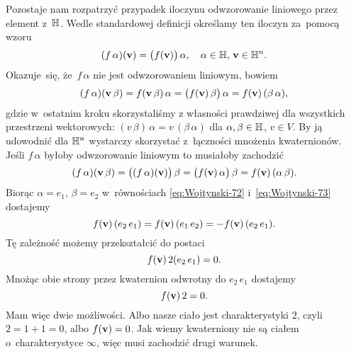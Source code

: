 \documentclass[a4paper,11pt]{article}
\begin{document}
Pozostaje nam rozpatrzyć przypadek iloczynu odwzorowanie liniowego przez
element z~$\mathbb{H}$. Wedle standardowej definicji określamy ten iloczyn
za~pomocą wzoru
\begin{equation}
  \label{eq:Wojtynski-71}
  ( f \, \alpha )( \mathbf{v} ) = \big( f( \mathbf{v} ) \big) \, \alpha, \quad
  \alpha \in \mathbb{H}, \, \mathbf{v} \in \mathbb{H}^{ n }.
\end{equation}
Okazuje~się, że~$f \, \alpha$ nie jest odwzorowaniem liniowym, bowiem
\begin{equation}
  \label{eq:Wojtynski-72}
  ( f \, \alpha )( \mathbf{v} \, \beta ) = f( \mathbf{v} \, \beta ) \, \alpha =
  \big( f( \mathbf{v} ) \, \beta \big) \, \alpha =
  f( \mathbf{v} ) \, ( \beta \, \alpha ),
\end{equation}
gdzie w~ostatnim kroku skorzystaliśmy z własności prawdziwej dla
wszystkich przestrzeni wektorowych:
$( v \, \beta ) \, \alpha = v \, ( \beta \, \alpha )$ dla $\alpha, \beta \in \mathbb{H}$, $v \in V$. By ją
udowodnić dla $\mathbb{H}^{ n }$ wystarczy skorzystać z~łączności mnożenia
kwaternionów. Jeśli $f \, \alpha$ byłoby odwzorowanie liniowym to musiałoby
zachodzić
\begin{equation}
  \label{eq:Wojtynski-73}
  ( f \, \alpha )( \mathbf{v} \, \beta ) =
  \big( ( f \, \alpha )( \mathbf{v} ) \big) \, \beta =
  \big( f( \mathbf{v} ) \, \alpha \big) \, \beta =
  f( \mathbf{v} ) \, ( \alpha \, \beta ).
\end{equation}
Biorąc $\alpha = e_{ 1 }$, $\beta = e_{ 2 }$ w~równościach \eqref{eq:Wojtynski-72}
i~\eqref{eq:Wojtynski-73} dostajemy
\begin{equation}
  \label{eq:Wojtynski-74}
  f( \mathbf{v} ) \, ( e_{ 2 } \, e_{ 1 } ) =
  f( \mathbf{v} ) \, ( e_{ 1 } \, e_{ 2 } ) =
  -f( \mathbf{v} ) \, ( e_{ 2 } \, e_{ 1 } ).
\end{equation}
Tę zależność możemy przekształcić do postaci
\begin{equation}
  \label{eq:Wojtynski-75}
  f( \mathbf{v} ) \, 2 ( e_{ 2 } \, e_{ 1 } ) = 0.
\end{equation}
Mnożąc obie strony przez kwaternion odwrotny do $e_{ 2 } \, e_{ 1 }$
dostajemy
\begin{equation}
  \label{eq:Wojtynski-76}
  f( \mathbf{v} ) \, 2 = 0.
\end{equation}
Mam więc dwie możliwości. Albo nasze ciało jest charakterystyki 2,
czyli~$2 = 1 + 1 = 0$, albo $f( \mathbf{v} ) = 0$. Jak wiemy kwaterniony nie
są ciałem o~charakterystyce $\infty$, więc musi zachodzić drugi warunek.
\end{document}
